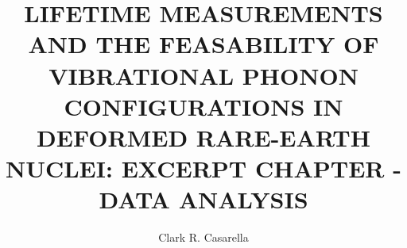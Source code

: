\documentclass[final,noinfo,sort&compress]{nddiss2e}
\begin{document}

\frontmatter         %

\title{LIFETIME MEASUREMENTS AND THE FEASABILITY OF VIBRATIONAL PHONON CONFIGURATIONS IN DEFORMED RARE-EARTH NUCLEI: EXCERPT CHAPTER - DATA ANALYSIS}
\author{Clark R. Casarella}           %

\maketitle           %

 \makepublicdomain   %
\end{document}
